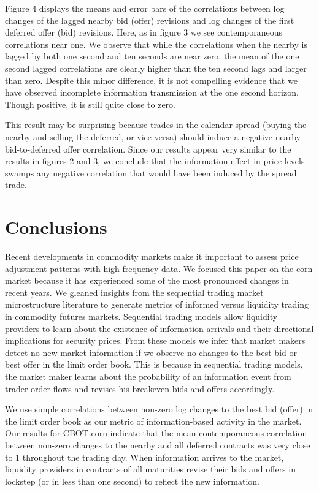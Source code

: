 \documentclass[review,12pt]{elsarticle}
\begin{document}
Figure 4 displays the means and error bars of the correlations between
log changes of the lagged nearby bid (offer) revisions and log changes
of the first deferred offer (bid) revisions. Here, as in figure 3 we see
contemporaneous correlations near one. We observe that while the
correlations when the nearby is lagged by both one second and ten
seconds are near zero, the mean of the one second lagged correlations
are clearly higher than the ten second lags and larger than zero.
Despite this minor difference, it is not compelling evidence that we
have observed incomplete information transmission at the one second
horizon. Though positive, it is still quite close to zero.

This result may be surprising because trades in the calendar spread
(buying the nearby and selling the deferred, or vice versa) should
induce a negative nearby bid-to-deferred offer correlation. Since our
results appear very similar to the results in figures 2 and 3, we
conclude that the information effect in price levels swamps any negative
correlation that would have been induced by the spread trade.

\section{Conclusions}\label{conclusions}

Recent developments in commodity markets make it important to assess
price adjustment patterns with high frequency data. We focused this
paper on the corn market because it has experienced some of the most
pronounced changes in recent years. We gleaned insights from the
sequential trading market microstructure literature to generate metrics
of informed versus liquidity trading in commodity futures markets.
Sequential trading models allow liquidity providers to learn about the
existence of information arrivals and their directional implications for
security prices. From these models we infer that market makers detect no
new market information if we observe no changes to the best bid or best
offer in the limit order book. This is because in sequential trading
models, the market maker learns about the probability of an information
event from trader order flows and revises his breakeven bids and offers
accordingly.

We use simple correlations between non-zero log changes to the best bid
(offer) in the limit order book as our metric of information-based
activity in the market. Our results for CBOT corn indicate that the mean
contemporaneous correlation between non-zero changes to the nearby and
all deferred contracts was very close to 1 throughout the trading day.
When information arrives to the market, liquidity providers in contracts
of all maturities revise their bids and offers in lockstep (or in less
than one second) to reflect the new information.
\end{document}
